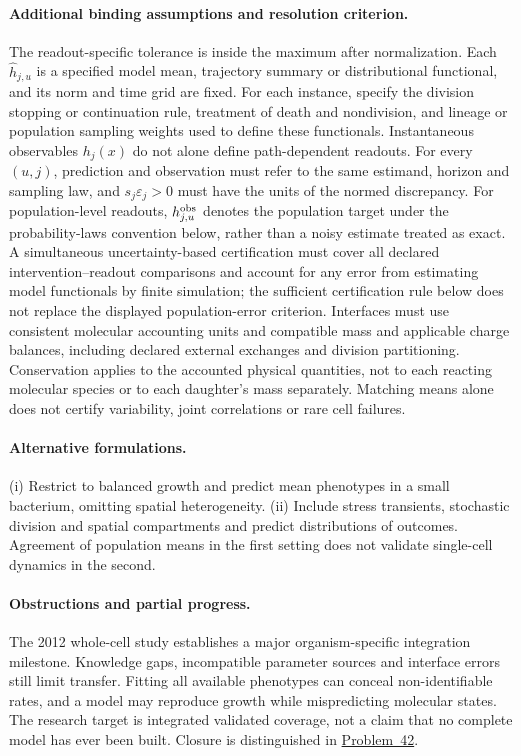 \documentclass[11pt]{article}
\begin{document}
\paragraph{Additional binding assumptions and resolution criterion.} The readout-specific tolerance is inside the maximum after normalization. Each $\widehat h_{j,u}$ is a specified model mean, trajectory summary or distributional functional, and its norm and time grid are fixed. For each instance, specify the division stopping or continuation rule, treatment of death and nondivision, and lineage or population sampling weights used to define these functionals. Instantaneous observables $h_j(x)$ do not alone define path-dependent readouts. For every $(u,j)$, prediction and observation must refer to the same estimand, horizon and sampling law, and $s_j\varepsilon_j>0$ must have the units of the normed discrepancy. For population-level readouts, $h_{j,u}^{\rm obs}$ denotes the population target under the probability-laws convention below, rather than a noisy estimate treated as exact. A simultaneous uncertainty-based certification must cover all declared intervention--readout comparisons and account for any error from estimating model functionals by finite simulation; the sufficient certification rule below does not replace the displayed population-error criterion. Interfaces must use consistent molecular accounting units and compatible mass and applicable charge balances, including declared external exchanges and division partitioning. Conservation applies to the accounted physical quantities, not to each reacting molecular species or to each daughter's mass separately. Matching means alone does not certify variability, joint correlations or rare cell failures.

\paragraph{Alternative formulations.} (i) Restrict to balanced growth and predict mean phenotypes in a small bacterium, omitting spatial heterogeneity. (ii) Include stress transients, stochastic division and spatial compartments and predict distributions of outcomes. Agreement of population means in the first setting does not validate single-cell dynamics in the second.
\paragraph{Obstructions and partial progress.} The 2012 whole-cell study establishes a major organism-specific integration milestone. Knowledge gaps, incompatible parameter sources and interface errors still limit transfer. Fitting all available phenotypes can conceal non-identifiable rates, and a model may reproduce growth while mispredicting molecular states. The research target is integrated validated coverage, not a claim that no complete model has ever been built. Closure is distinguished in \href{https://we-solve.github.io/problems/multiscale-closure-dc3cdc93/}{Problem~42}.
\end{document}

